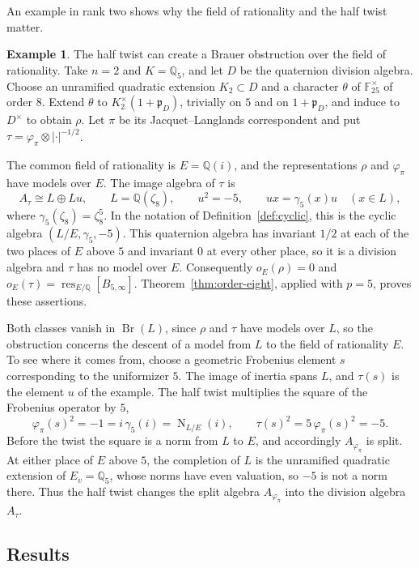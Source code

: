 \documentclass[a4paper,11pt]{amsart}
\theoremstyle{definition}
\newtheorem{example}[theorem]{Example}
\theoremstyle{remark}
\numberwithin{equation}{section}
\newcommand{\Q}{\mathbb{Q}}
\DeclareMathOperator{\Br}{Br}
\DeclareMathOperator{\res}{res}
\newcommand{\F}{\mathbb{F}}
\DeclareMathOperator{\Nm}{N}
\begin{document}
An example in rank two shows why the field of rationality and the half twist matter.

\begin{example}\label{ex:intro-five}
The half twist can create a Brauer obstruction over the field of rationality. Take $n=2$ and $K=\Q_5$, and let $D$ be the quaternion division algebra. Choose an unramified quadratic extension $K_2\subset D$ and a character $\theta$ of $\F_{25}^\times$ of order $8$. Extend $\theta$ to $K_2^\times(1+\mathfrak p_D)$, trivially on $5$ and on $1+\mathfrak p_D$, and induce to $D^\times$ to obtain $\rho$. Let $\pi$ be its Jacquet--Langlands correspondent and put $\tau=\varphi_\pi\otimes|\cdot|^{-1/2}$.

The common field of rationality is $E=\Q(i)$, and the representations $\rho$ and $\varphi_\pi$ have models over $E$. The image algebra of $\tau$ is
\[
 A_\tau\cong L\oplus Lu,\qquad L=\Q(\zeta_8),\qquad u^2=-5,\qquad ux=\gamma_5(x)u\quad(x\in L),
\]
where $\gamma_5(\zeta_8)=\zeta_8^5$. In the notation of Definition~\ref{def:cyclic}, this is the cyclic algebra $(L/E,\gamma_5,-5)$. This quaternion algebra has invariant $1/2$ at each of the two places of $E$ above $5$ and invariant $0$ at every other place, so it is a division algebra and $\tau$ has no model over $E$. Consequently $o_E(\rho)=0$ and $o_E(\tau)=\res_{E/\Q}[B_{5,\infty}]$. Theorem~\ref{thm:order-eight}, applied with $p=5$, proves these assertions.
\end{example}

Both classes vanish in $\Br(L)$, since $\rho$ and $\tau$ have models over $L$, so the obstruction concerns the descent of a model from $L$ to the field of rationality $E$. To see where it comes from, choose a geometric Frobenius element $s$ corresponding to the uniformizer $5$. The image of inertia spans $L$, and $\tau(s)$ is the element $u$ of the example. The half twist multiplies the square of the Frobenius operator by $5$,
\[
 \varphi_\pi(s)^2=-1=i\,\gamma_5(i)=\Nm_{L/E}(i),\qquad \tau(s)^2=5\,\varphi_\pi(s)^2=-5.
\]
Before the twist the square is a norm from $L$ to $E$, and accordingly $A_{\varphi_\pi}$ is split. At either place of $E$ above $5$, the completion of $L$ is the unramified quadratic extension of $E_v=\Q_5$, whose norms have even valuation, so $-5$ is not a norm there. Thus the half twist changes the split algebra $A_{\varphi_\pi}$ into the division algebra $A_\tau$. 

\subsection{Results}\label{subsec:intro-results}
\end{document}
